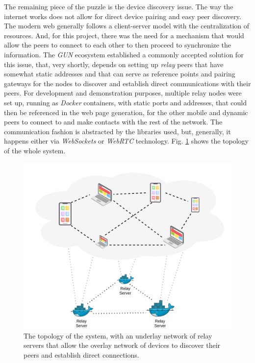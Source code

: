 \documentclass[journal]{IEEEtran}
\begin{document}
The remaining piece of the puzzle is the device discovery issue. The way the internet works does not
allow for direct device pairing and easy peer discovery. The modern web generally follows a 
client-server model with the centralization of resources. And, for this project, there was the need
for a mechanism that would allow the peers to connect to each other to then proceed to synchronize
the information. The \emph{GUN} ecosystem established a commonly accepted solution for this issue, that, 
very shortly, depends on setting up \emph{relay} peers that have somewhat static addresses and that can 
serve as reference points and pairing gateways for the nodes to discover and establish direct communications 
with their peers. For development and demonstration purposes, multiple relay nodes were set up, running 
as \emph{Docker} containers, with static ports and addresses, that could then be referenced in the web 
page generation, for the other mobile and dynamic peers to connect to and make contacts with the rest of the network.
The communication fashion is abstracted by the libraries used, but, generally, it happens either via \emph{WebSockets}
or \emph{WebRTC} technology. Fig. \ref{fig:in-browser-pow-topology} shows the topology of the whole system.

\begin{figure}[h]
  \centering
  \includegraphics[width=\columnwidth]{in-browser-pow-topology}
  \caption{The topology of the system, with an underlay network of relay servers that allow the overlay network of devices to discover their peers and establish direct connections.}
  \label{fig:in-browser-pow-topology}
\end{figure}
\end{document}
